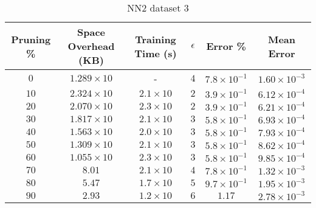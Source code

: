 \begin{adjustwidth}{0cm}{}
\begin{table}
\caption{NN2 dataset 3}\label{pr23}
\begin{tabular}{cccccc}
\hline
\toprule
Pruning \% & Space Overhead (KB) & Training Time (s) & $\epsilon$ & Error \% & Mean Error\\
\midrule
$0$ & $1.289 \times 10$ & - & $4$ & $7.8 \times 10^{-1}$ & $1.60 \times 10^{-3}$\\
$10$ & $2.324 \times 10$ & $2.1 \times 10$ & $2$ & $3.9 \times 10^{-1}$ & $6.12 \times 10^{-4}$\\
$20$ & $2.070 \times 10$ & $2.3 \times 10$ & $2$ & $3.9 \times 10^{-1}$ & $6.21 \times 10^{-4}$\\
$30$ & $1.817 \times 10$ & $2.1 \times 10$ & $3$ & $5.8 \times 10^{-1}$ & $6.93 \times 10^{-4}$\\
$40$ & $1.563 \times 10$ & $2.0 \times 10$ & $3$ & $5.8 \times 10^{-1}$ & $7.93 \times 10^{-4}$\\
$50$ & $1.309 \times 10$ & $2.1 \times 10$ & $3$ & $5.8 \times 10^{-1}$ & $8.62 \times 10^{-4}$\\
$60$ & $1.055 \times 10$ & $2.3 \times 10$ & $3$ & $5.8 \times 10^{-1}$ & $9.85 \times 10^{-4}$\\
$70$ & $8.01$ & $2.1 \times 10$ & $4$ & $7.8 \times 10^{-1}$ & $1.32 \times 10^{-3}$\\
$80$ & $5.47$ & $1.7 \times 10$ & $5$ & $9.7 \times 10^{-1}$ & $1.95 \times 10^{-3}$\\
$90$ & $2.93$ & $1.2 \times 10$ & $6$ & $1.17$ & $2.78 \times 10^{-3}$\\
\bottomrule
\end{tabular}
\end{table}
\end{adjustwidth}

\null\par\null


